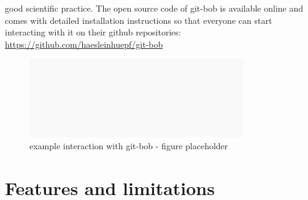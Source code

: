 \documentclass{ecai}
\begin{document}
good scientific practice. The open source code of git-bob is available online and comes with detailed installation instructions so that everyone can start interacting with it on their github repositories: \url{https://github.com/haesleinhuepf/git-bob}

\begin{figure}[h]
\centering
\includegraphics[width=0.82\textwidth]{fig1_example_interaction.png}
\caption{example interaction with git-bob - figure placeholder
\newline
\newline
}
\label{fig:exampleinteraction}
\end{figure}


\section{Features and limitations}
\end{document}
